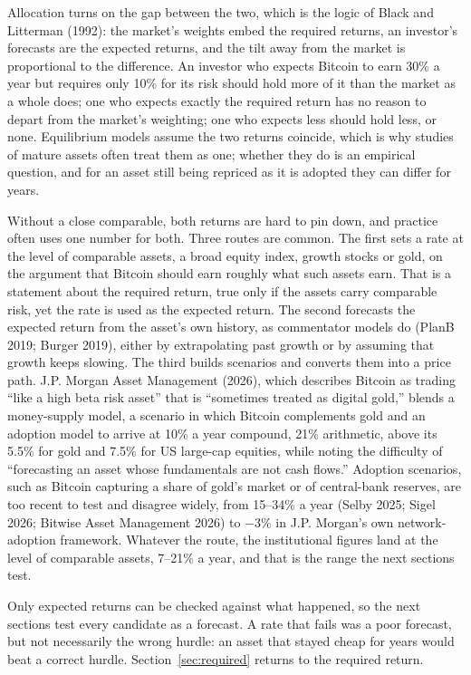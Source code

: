 \documentclass[12pt]{article}
\theoremstyle{plain}
\theoremstyle{remark}
\begin{document}
Allocation turns on the gap between the two, which is the logic of Black and Litterman (1992): the market's weights embed the required returns, an investor's forecasts are the expected returns, and the tilt away from the market is proportional to the difference. An investor who expects Bitcoin to earn 30\% a year but requires only 10\% for its risk should hold more of it than the market as a whole does; one who expects exactly the required return has no reason to depart from the market's weighting; one who expects less should hold less, or none. Equilibrium models assume the two returns coincide, which is why studies of mature assets often treat them as one; whether they do is an empirical question, and for an asset still being repriced as it is adopted they can differ for years.

Without a close comparable, both returns are hard to pin down, and practice often uses one number for both. Three routes are common. The first sets a rate at the level of comparable assets, a broad equity index, growth stocks or gold, on the argument that Bitcoin should earn roughly what such assets earn. That is a statement about the required return, true only if the assets carry comparable risk, yet the rate is used as the expected return. The second forecasts the expected return from the asset's own history, as commentator models do (PlanB 2019; Burger 2019), either by extrapolating past growth or by assuming that growth keeps slowing. The third builds scenarios and converts them into a price path. J.P. Morgan Asset Management (2026), which describes Bitcoin as trading ``like a high beta risk asset'' that is ``sometimes treated as digital gold,'' blends a money-supply model, a scenario in which Bitcoin complements gold and an adoption model to arrive at 10\% a year compound, 21\% arithmetic, above its 5.5\% for gold and 7.5\% for US large-cap equities, while noting the difficulty of ``forecasting an asset whose fundamentals are not cash flows.'' Adoption scenarios, such as Bitcoin capturing a share of gold's market or of central-bank reserves, are too recent to test and disagree widely, from 15--34\% a year (Selby 2025; Sigel 2026; Bitwise Asset Management 2026) to $-3$\% in J.P. Morgan's own network-adoption framework. Whatever the route, the institutional figures land at the level of comparable assets, 7--21\% a year, and that is the range the next sections test.

Only expected returns can be checked against what happened, so the next sections test every candidate as a forecast. A rate that fails was a poor forecast, but not necessarily the wrong hurdle: an asset that stayed cheap for years would beat a correct hurdle. Section~\ref{sec:required} returns to the required return.
\end{document}
